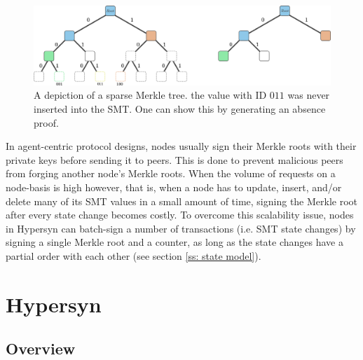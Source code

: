\documentclass{article}
\begin{document}
\begin{figure}[h]
\centering\includegraphics[width=0.8\linewidth]{figures/smt_absence_proof.png}
\caption{A depiction of a sparse Merkle tree. the value with ID $011$ was never inserted into the SMT. One can show this by generating an absence proof.}
\label{fig:SMT_absence}
\end{figure}

In agent-centric protocol designs, nodes usually sign their Merkle roots with their private keys before sending it to peers. This is done to prevent malicious peers from forging another node's Merkle roots. When the volume of requests on a node-basis is high however, that is, when a node has to update, insert, and/or delete many of its SMT values in a small amount of time, signing the Merkle root after every state change becomes costly. To overcome this scalability issue, nodes in Hypersyn can batch-sign a number of transactions (i.e. SMT state changes) by signing a single Merkle root and a counter, as long as the state changes have a partial order with each other (see section \ref{ss: state model}).


\section{Hypersyn}
\label{hypersyn}

\subsection{Overview}
\label{ss: overview}
\end{document}
